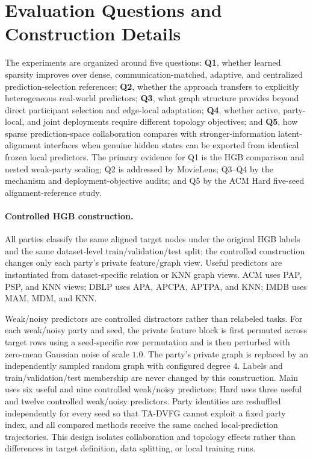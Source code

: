 \documentclass[letterpaper]{article}
\newcommand{\method}{\textsc{TA-DVFG}}
\begin{document}
\section{Evaluation Questions and Construction Details}

The experiments are organized around five questions: \textbf{Q1}, whether
learned sparsity improves over dense, communication-matched, adaptive,
and centralized prediction-selection references; \textbf{Q2}, whether the approach transfers to
explicitly heterogeneous real-world predictors; \textbf{Q3}, what graph
structure provides beyond direct participant selection and edge-local
adaptation; \textbf{Q4}, whether active, party-local, and joint deployments
require different topology objectives; and \textbf{Q5}, how sparse
prediction-space collaboration compares with stronger-information
latent-alignment interfaces when genuine hidden states can be exported from
identical frozen local predictors. The primary evidence for Q1 is the HGB
comparison and nested weak-party scaling; Q2 is addressed by MovieLens; Q3--Q4
by the mechanism and deployment-objective audits; and Q5 by the ACM Hard
five-seed alignment-reference study.

\paragraph{Controlled HGB construction.}
All parties classify the same aligned target nodes under the original HGB labels
and the same dataset-level train/validation/test split; the controlled
construction changes only each party's private feature/graph view. Useful
predictors are instantiated from dataset-specific relation or KNN graph views.
ACM uses PAP, PSP, and KNN views; DBLP uses APA, APCPA, APTPA, and KNN; IMDB
uses MAM, MDM, and KNN.

Weak/noisy predictors are controlled distractors rather than relabeled tasks.
For each weak/noisy party and seed, the private feature block is first permuted
across target rows using a seed-specific row permutation and is then perturbed
with zero-mean Gaussian noise of scale $1.0$. The party's private graph is
replaced by an independently sampled random graph with configured degree $4$.
Labels and train/validation/test membership are never changed by this
construction. Main uses six useful and nine controlled weak/noisy predictors;
Hard uses three useful and twelve controlled weak/noisy predictors. Party
identities are reshuffled independently for every seed so that \method{} cannot
exploit a fixed party index, and all compared methods receive the same cached
local-prediction trajectories. This design isolates collaboration and topology
effects rather than differences in target definition, data splitting, or local
training runs.
\end{document}
